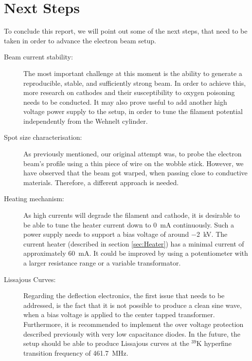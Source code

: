 
\chapter{Next Steps}
 
To conclude this report, we will point out some of the next steps, that need to be taken in order to advance the electron beam setup. 

\begin{description}
	\item[Beam current stability:] The most important challenge at this moment is the ability to generate a reproducible, stable, and sufficiently strong beam. In order to achieve this, more research on cathodes and their susceptibility to oxygen poisoning needs to be conducted. It may also prove useful to add another high voltage power supply to the setup, in order to tune the filament potential independently from the Wehnelt cylinder. 
	\item[Spot size characterisation:] As previously mentioned, our original attempt was, to probe the electron beam's profile using a thin piece of wire on the wobble stick. However, we have observed that the beam got warped, when passing close to conductive materials. Therefore, a different approach is needed. 
	\item[Heating mechanism:] As high currents will degrade the filament and cathode, it is desirable to be able to tune the heater current down to \SI{0}{\milli\ampere} continuously. Such a power supply needs to support a bias voltage of around \SI{-2}{\kilo\volt}. The current heater (described in section \cref{sec:Heater}) has a minimal current of approximately \SI{60}{\milli\ampere}. It could be improved by using a potentiometer with a larger resistance range or a variable transformator. 
	\item[Lissajous Curves:] Regarding the deflection electronics, the first issue that needs to be addressed, is the fact that it is not possible to produce a clean sine wave, when a bias voltage is applied to the center tapped transformer. Furthermore, it is recommended to implement the over voltage protection described previously with very low capacitance diodes.  
	In the future, the setup should be able to produce Lissajous curves at the  $^{39}\mathrm{K}$ hyperfine transition frequency of \SI{461.7}{\mega\hertz}. 

\end{description}